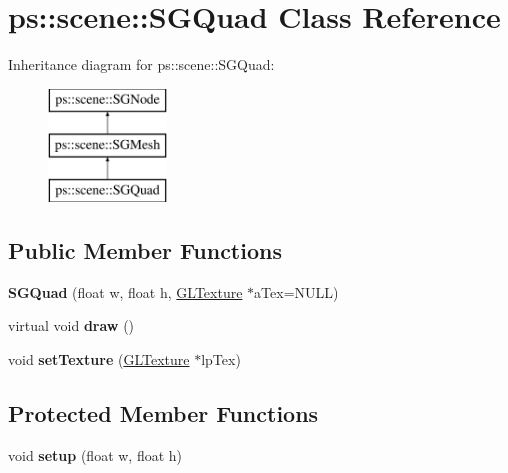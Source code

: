 \hypertarget{classps_1_1scene_1_1SGQuad}{}\section{ps\+:\+:scene\+:\+:S\+G\+Quad Class Reference}
\label{classps_1_1scene_1_1SGQuad}
Inheritance diagram for ps\+:\+:scene\+:\+:S\+G\+Quad\+:\begin{figure}[H]
\begin{center}
\leavevmode
\includegraphics[height=3.000000cm]{classps_1_1scene_1_1SGQuad}
\end{center}
\end{figure}
\subsection*{Public Member Functions}
\begin{DoxyCompactItemize}
\item 
\hypertarget{classps_1_1scene_1_1SGQuad_a3fb9a5a10d9301c9fa46e7b401adec98}{}{\bfseries S\+G\+Quad} (float w, float h, \hyperlink{classps_1_1opengl_1_1GLTexture}{G\+L\+Texture} $\ast$a\+Tex=N\+U\+L\+L)\label{classps_1_1scene_1_1SGQuad_a3fb9a5a10d9301c9fa46e7b401adec98}

\item 
\hypertarget{classps_1_1scene_1_1SGQuad_abd2907cfb1ed9178ac0e700c18c24fd2}{}virtual void {\bfseries draw} ()\label{classps_1_1scene_1_1SGQuad_abd2907cfb1ed9178ac0e700c18c24fd2}

\item 
\hypertarget{classps_1_1scene_1_1SGQuad_ad02ccfed33193a153403f97c14063ea3}{}void {\bfseries set\+Texture} (\hyperlink{classps_1_1opengl_1_1GLTexture}{G\+L\+Texture} $\ast$lp\+Tex)\label{classps_1_1scene_1_1SGQuad_ad02ccfed33193a153403f97c14063ea3}

\end{DoxyCompactItemize}
\subsection*{Protected Member Functions}
\begin{DoxyCompactItemize}
\item 
\hypertarget{classps_1_1scene_1_1SGQuad_acab2a4abc50a608f5fae42d1da9b3f34}{}void {\bfseries setup} (float w, float h)\label{classps_1_1scene_1_1SGQuad_acab2a4abc50a608f5fae42d1da9b3f34}

\end{DoxyCompactItemize}
